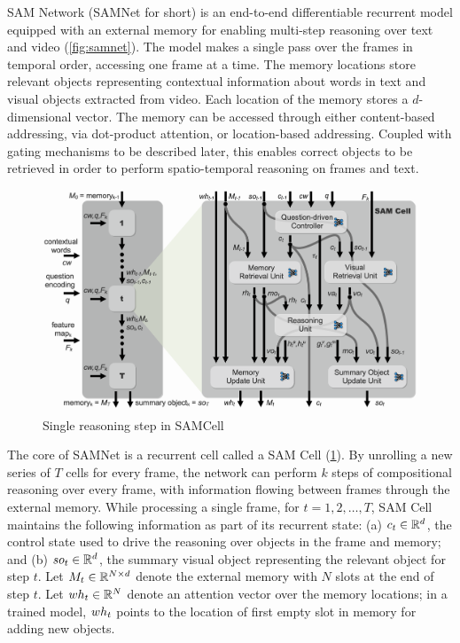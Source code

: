 SAM Network (SAMNet for short) is an end-to-end differentiable recurrent model equipped with an external memory for enabling multi-step reasoning over text and video (\cref{fig:samnet}).
The model makes a single pass over the frames in temporal order, accessing one frame at a time.
The memory locations store relevant objects representing contextual information about words in text and visual objects extracted from video. 
Each location of the memory stores a $d$-dimensional vector. %
The memory  can be accessed through either content-based addressing, via dot-product attention, or location-based addressing. 
Coupled with gating mechanisms to be described later, this enables correct objects to be retrieved 
in order to perform spatio-temporal reasoning on frames and text. 

\begin{figure}[hbtp]
	\centering
	\includegraphics[width=\textwidth]{../img/architecture/samcell_reasoning}
	\caption{Single reasoning step in SAMCell}
	\label{fig:samcell}
\end{figure}	

The core of SAMNet is a recurrent cell called a SAM Cell (\cref{fig:samcell}). 
By unrolling a new series of $T$ cells for every frame, the network can perform $k$ steps of compositional
reasoning over every frame, with information flowing between frames through the external memory. 
While processing a single frame, for $t=1,2, \dots, T$, SAM Cell maintains the following information as part of its recurrent state:
(a) $c_t \in \mathbb{R}^d$, the control state used to drive the reasoning over objects in the frame and memory; and
(b) $so_t  \in \mathbb{R}^d$, the summary visual object representing the relevant object for step $t$.
Let $M_t \in  \mathbb{R}^{N \times d}$ denote the external memory with $N$ slots at the end of step $t$.
Let $wh_t \in  \mathbb{R}^N$ denote an attention vector over the memory locations;
in a trained model, $wh_t$ points to the location of first empty slot in memory for adding new objects.   

